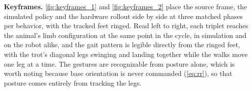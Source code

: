 \documentclass[letterpaper, 10 pt, conference]{ieeeconf}
\newcommand{\draft}[1]{}
\begin{document}
\draft{
Duty factor drifts upward at every step while phasing does not. Under both contact detectors it rises monotonically from reference to simulation to hardware, but the height detector rises only about half as far as the force detector, so roughly half the drift is the detector and half is real. Diagonal offset does not drift at all (\autoref{tab:all}). Phase structure is therefore what transfers, at a slower and more conservative operating point. Reference agreement on the robot degrades by $15-25\%$ from simulation across the five behaviors (\autoref{tab:all}). The gap is largest on the two walks, where the longer real stance phase lags the reference's swing timing, and smallest on the slow gestures.
}

\textbf{Keyframes.} \autoref{fig:keyframes_1} and \autoref{fig:keyframes_2} place the source frame, the simulated policy and the hardware rollout side by side at three matched phases per behavior, with the tracked feet ringed. Read left to right, each triplet reaches the animal's limb configuration at the same point in the cycle, in simulation and on the robot alike, and the gait pattern is legible directly from the ringed feet, with the trot's diagonal legs swinging and landing together while the walks move one leg at a time. The gestures are recognizable from posture alone, which is worth noting because base orientation is never commanded (\autoref{eq:rr}), so that posture comes entirely from tracking the legs.
\end{document}
